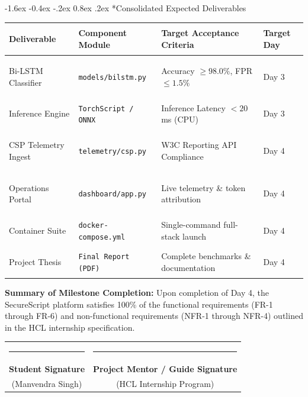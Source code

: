 \documentclass[11pt,a4paper]{article}
\makeatletter
\renewcommand{\section}{\@startsection{section}{1}{\z@}%
  {-1.6ex \@plus -0.4ex \@minus -.2ex}%
  {0.8ex \@plus .2ex}%
  {\normalfont\large\bfseries\color{primaryblue}}}
\makeatother
\begin{document}
\section*{Consolidated Expected Deliverables}
\begin{table}[htbp]
\centering
\footnotesize
\begin{tabularx}{\textwidth}{>{\bfseries\raggedright\arraybackslash}p{2.6cm} >{\raggedright\arraybackslash}p{3.2cm} >{\raggedright\arraybackslash}X >{\centering\arraybackslash}p{1.8cm}}
\toprule
\textbf{Deliverable} & \textbf{Component Module} & \textbf{Target Acceptance Criteria} & \textbf{Target Day} \\
\midrule
Bi-LSTM Classifier & \texttt{models/bilstm.py} & Accuracy $\ge 98.0\%$, FPR $\le 1.5\%$ & Day 3 \\
\addlinespace
Inference Engine & \texttt{TorchScript / ONNX} & Inference Latency $< 20$\,ms (CPU) & Day 3 \\
\addlinespace
CSP Telemetry Ingest & \texttt{telemetry/csp.py} & W3C Reporting API Compliance & Day 4 \\
\addlinespace
Operations Portal & \texttt{dashboard/app.py} & Live telemetry \& token attribution & Day 4 \\
\addlinespace
Container Suite & \texttt{docker-compose.yml} & Single-command full-stack launch & Day 4 \\
\addlinespace
Project Thesis & \texttt{Final Report (PDF)} & Complete benchmarks \& documentation & Day 4 \\
\bottomrule
\end{tabularx}
\end{table}

\vspace{1.5em}

\noindent
\textbf{Summary of Milestone Completion:} Upon completion of Day 4, the SecureScript platform satisfies 100\% of the functional requirements (FR-1 through FR-6) and non-functional requirements (NFR-1 through NFR-4) outlined in the HCL internship specification.

\vspace{2.2em}
\begin{flushright}
\begin{tabular}{cc}
\rule{5.0cm}{0.4pt} & \rule{5.0cm}{0.4pt} \\
\textbf{Student Signature} & \textbf{Project Mentor / Guide Signature} \\
\footnotesize (Manvendra Singh) & \footnotesize (HCL Internship Program) \\
\end{tabular}
\end{flushright}
\end{document}
